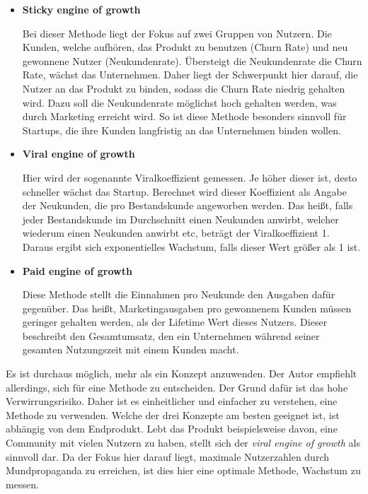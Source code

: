 \begin{itemize}
	\item \textbf{Sticky engine of growth}
	
	Bei dieser Methode liegt der Fokus auf zwei Gruppen von Nutzern. Die Kunden, welche aufhören, das Produkt zu benutzen (Churn Rate) und neu gewonnene Nutzer (Neukundenrate). Übersteigt die Neukundenrate die Churn Rate, wächst das Unternehmen. Daher liegt der Schwerpunkt hier darauf, die Nutzer an das Produkt zu binden, sodass die Churn Rate niedrig gehalten wird. Dazu soll die Neukundenrate möglichst hoch gehalten werden, was durch Marketing erreicht wird. So ist diese Methode besonders sinnvoll für Startups, die ihre Kunden langfristig an das Unternehmen binden wollen.
	\item \textbf{Viral engine of growth}
	
	Hier wird der sogenannte Viralkoeffizient gemessen. Je höher dieser ist, desto schneller wächst das Startup. Berechnet wird dieser Koeffizient als Angabe der Neukunden, die pro Bestandskunde angeworben werden. Das heißt, falls jeder Bestandskunde im Durchschnitt einen Neukunden anwirbt, welcher wiederum einen Neukunden anwirbt etc, beträgt der Viralkoeffizient 1. Daraus ergibt sich exponentielles Wachstum, falls dieser Wert größer als 1 ist.
	\item \textbf{Paid engine of growth}
	
	Diese Methode stellt die Einnahmen pro Neukunde den Ausgaben dafür gegenüber. Das heißt, Marketingausgaben pro gewonnenem Kunden müssen geringer gehalten werden, als der Lifetime Wert dieses Nutzers. Dieser beschreibt den Gesamtumsatz, den ein Unternehmen während seiner gesamten Nutzungszeit mit einem Kunden macht.
\end{itemize}

Es ist durchaus möglich, mehr als ein Konzept anzuwenden. Der Autor empfiehlt allerdings, sich für eine Methode zu entscheiden. Der Grund dafür ist das hohe Verwirrungsrisiko. Daher ist es einheitlicher und einfacher zu verstehen, eine Methode zu verwenden. Welche der drei Konzepte am besten geeignet ist, ist abhängig von dem Endprodukt. Lebt das Produkt beispielsweise davon, eine Community mit vielen Nutzern zu haben, stellt sich der \textit{viral engine of growth} als sinnvoll dar. Da der Fokus hier darauf liegt, maximale Nutzerzahlen durch Mundpropaganda zu erreichen, ist dies hier eine optimale Methode, Wachstum zu messen.
\cite{TheLeanStartup}
